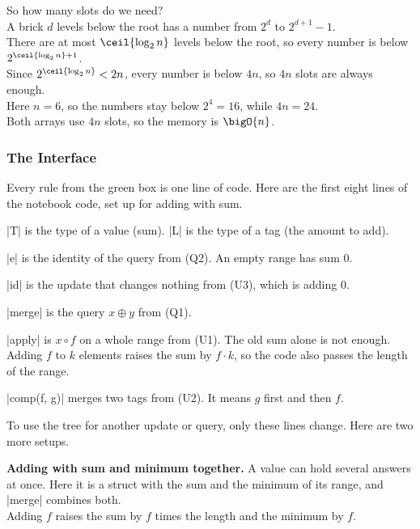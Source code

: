 So how many slots do we need? \\
A brick \(d\) levels below the root has a number from \(2^d\) to \(2^{d + 1} - 1\). \\
There are at most \(\ceil{\log_2 n}\) levels below the root, so every number is below \(2^{\ceil{\log_2 n} + 1}\). \\
Since \(2^{\ceil{\log_2 n}} < 2n\), every number is below \(4n\), so \(4n\) slots are always enough. \\
Here \(n = 6\), so the numbers stay below \(2^4 = 16\), while \(4n = 24\). \\
Both arrays use \(4n\) slots, so the memory is \(\bigO{n}\).

\subsubsection{The Interface}
Every rule from the green box is one line of code. Here are the first eight lines of the notebook code, set up for adding with sum.


\begin{notes}
\begin{lines}
\item[Lines 2--3] \code|T| is the type of a value (sum). \code|L| is the type of a tag (the amount to add).
\item[Line 4] \code|e| is the identity of the query from \textup{(Q2)}. An empty range has sum 0.
\item[Line 5] \code|id| is the update that changes nothing from \textup{(U3)}, which is adding 0.
\item[Line 6] \code|merge| is the query \(x \oplus y\) from \textup{(Q1)}.
\item[Line 7] \code|apply| is \(x \circ f\) on a whole range from \textup{(U1)}. The old sum alone is not enough. Adding \(f\) to \(k\) elements raises the sum by \(f \cdot k\), so the code also passes the length of the range.
\item[Line 8] \code|comp(f, g)| merges two tags from \textup{(U2)}. It means \(g\) first and then \(f\).
\end{lines}
\end{notes}

To use the tree for another update or query, only these lines change. Here are two more setups.

\textbf{Adding with sum and minimum together.} A value can hold several answers at once. Here it is a struct with the sum and the minimum of its range, and \code|merge| combines both. \\
Adding \(f\) raises the sum by \(f\) times the length and the minimum by \(f\).

